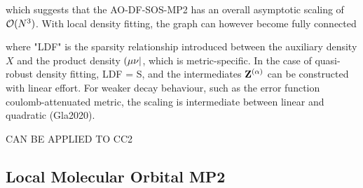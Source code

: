 \noindent which suggests that the AO-DF-SOS-MP2 has an overall asymptotic scaling of $\mathcal{O}(N^{3})$. With local density fitting, the graph can however become fully connected
\begin{center}
\end{center}

\noindent where "LDF" is the sparsity relationship introduced between the auxiliary density $X$ and the product density $\left( \mu\nu \right\rvert$, which is metric-specific. In the case of quasi-robust density fitting, LDF = S, and the intermediates $\mathbf{Z}^{(\alpha)}$ can be constructed with linear effort. For weaker decay behaviour, such as the error function coulomb-attenuated metric, the scaling is intermediate between linear and quadratic (Gla2020). 

CAN BE APPLIED TO CC2



\subsection{Local Molecular Orbital MP2}

